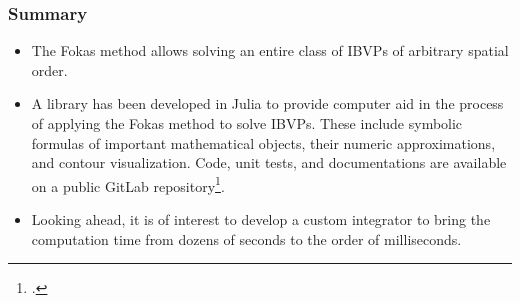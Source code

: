 \documentclass{beamer}
\begin{document}
\begin{frame}
    \frametitle{Summary}
    \begin{itemize}
        \item The Fokas method allows solving an entire class of IBVPs of arbitrary spatial order.
        \item A library has been developed in Julia to provide computer aid in the process of applying the Fokas method to solve IBVPs. These include symbolic formulas of important mathematical objects, their numeric approximations, and contour visualization. Code, unit tests, and documentations are available on a public GitLab repository\footcite{Xiao}.
        \item Looking ahead, it is of interest to develop a custom integrator to bring the computation time from dozens of seconds to the order of milliseconds.
    \end{itemize}
\end{frame}

% 
% 


\end{document}
